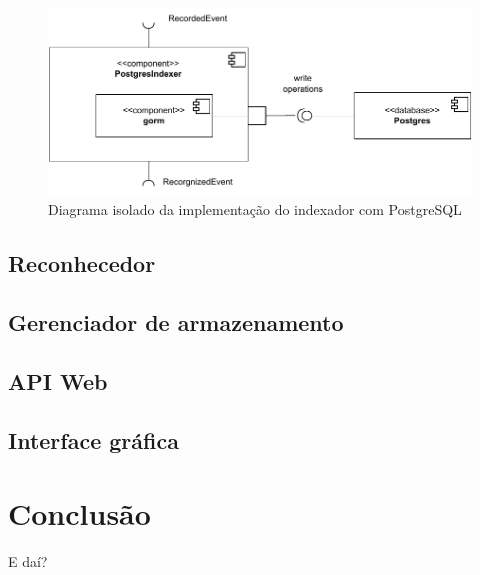 \documentclass[12pt, %
openright, 
oneside, %
a4paper,    %
brazil]{facom-ufu-abntex2}
\begin{document}
\begin{figure}[!ht]
	\centering
	\includegraphics[width=1\linewidth]{postgres_indexer.pdf}
	\caption[Diagrama isolado da implementação do indexador com PostgreSQL]{Diagrama isolado da implementação do indexador com PostgreSQL}
	\label{fig:graficosVariandoTamanhoRede}
\end{figure}

\section{Reconhecedor}







\section{Gerenciador de armazenamento}

\section{API Web}

\section{Interface gráfica}


\chapter[Conclusão]{Conclusão}
E daí?

\postextual


\end{document}
